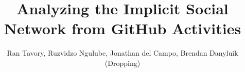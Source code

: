 \documentclass[sigconf,11pt]{acmart}
\begin{document}
\title{\Large Analyzing the Implicit Social Network from GitHub Activities}

\author{\normalsize Ran Tavory, Ruzvidzo Ngulube, Jonathan del Campo, Brendan Danyluik (Dropping)}









\end{document}
